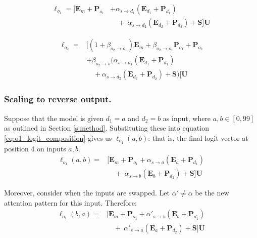 \begin{equation}
\label{eq:o1_logit_composition}
\begin{split}
    \boldsymbol \ell_{o_1} = 
    \big[\boldsymbol E_m +\boldsymbol P_{o_1}
    &+ \alpha_{s \to d_1}(\boldsymbol E_{d_1} +\boldsymbol P_{d_1}) \\
    &\quad + \ \alpha_{s \to d_2}(\boldsymbol E_{d_2} +\boldsymbol P_{d_2}) +\boldsymbol S\big]\boldsymbol U
\end{split}
\end{equation}

\begin{equation}
\label{eq:o2_logit_composition}
\begin{split}
    \boldsymbol \ell_{o_2} =
    &\big[(1+\beta_{o_2 \to o_1})\boldsymbol E_m 
    + \beta_{o_2 \to o_1}\boldsymbol P_{o_1} +\boldsymbol P_{o_2} \\
    &+ \beta_{o_2 \to s}\big(\alpha_{s \to d_1}(\boldsymbol E_{d_1} +\boldsymbol P_{d_1}) \\
    &\quad
    + \alpha_{s \to d_2}(\boldsymbol E_{d_2} +\boldsymbol P_{d_2}) +\boldsymbol S\big)\big]\boldsymbol U
\end{split}
\end{equation}

\subsubsection{Scaling to reverse output.}
Suppose that the model is given $d_1 = a$ and $d_2 = b$ as input, where $a,b \in [0, 99]$ as outlined in Section \ref{s:method}. Substituting these into equation \eqref{eq:o1_logit_composition} gives us $\boldsymbol \ell_{o_1}(a,b)$: that is, the final logit vector at position 4 on inputs $a,b$.
\begin{equation}
\label{eq:o1_ab}
\begin{split}
    \boldsymbol \ell_{o_1}(a,b) = 
    &\big[\boldsymbol E_m +\boldsymbol P_{o_1}
    + \alpha_{s \to a}(\boldsymbol E_a +\boldsymbol P_{d_1}) \\
    &\quad + \ \alpha_{s \to b}(\boldsymbol E_b +\boldsymbol P_{d_2}) +\boldsymbol S\big]\boldsymbol U
\end{split}
\end{equation}

Moreover, consider when the inputs are swapped. 
Let $\alpha' \not= \alpha$ be the new attention pattern for this input.
Therefore:
\begin{equation}
\label{eq:o1_ba}
\begin{split}
    \boldsymbol \ell_{o_1}(b,a) = 
    &\big[\boldsymbol E_m +\boldsymbol P_{o_1}
    + \alpha'_{s \to b}(\boldsymbol E_b +\boldsymbol P_{d_1}) \\
    &\quad + \ \alpha'_{s \to a}(\boldsymbol E_a +\boldsymbol P_{d_2}) +\boldsymbol S\big]\boldsymbol U
\end{split}
\end{equation}

